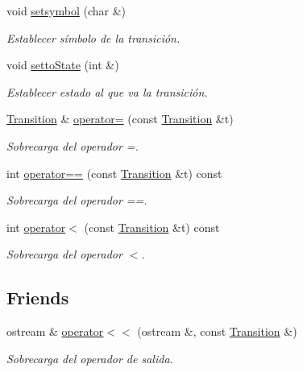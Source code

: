 \begin{DoxyCompactItemize}
void \hyperlink{class_transition_a5a20b15b7f4ab032742ad6391190cc6e}{setsymbol} (char \&)
\begin{DoxyCompactList}\small\item\em Establecer símbolo de la transición. \end{DoxyCompactList}\item 
void \hyperlink{class_transition_ab6247c399e434db72235b6764ff80d4e}{setto\+State} (int \&)
\begin{DoxyCompactList}\small\item\em Establecer estado al que va la transición. \end{DoxyCompactList}\item 
\hyperlink{class_transition}{Transition} \& \hyperlink{class_transition_a3bb2d846d692d08eae4f1f8a43fe212d}{operator=} (const \hyperlink{class_transition}{Transition} \&t)
\begin{DoxyCompactList}\small\item\em Sobrecarga del operador =. \end{DoxyCompactList}\item 
int \hyperlink{class_transition_accb01c1a940c05f24c306c506d8988ff}{operator==} (const \hyperlink{class_transition}{Transition} \&t) const
\begin{DoxyCompactList}\small\item\em Sobrecarga del operador ==. \end{DoxyCompactList}\item 
int \hyperlink{class_transition_a6dae95e1f97bf6f39a8ae10d210e0257}{operator$<$} (const \hyperlink{class_transition}{Transition} \&t) const
\begin{DoxyCompactList}\small\item\em Sobrecarga del operador $<$. \end{DoxyCompactList}\end{DoxyCompactItemize}
\subsection*{Friends}
\begin{DoxyCompactItemize}
\item 
ostream \& \hyperlink{class_transition_ab1393a65ad3451f1fb24f8fbf1f4247f}{operator$<$$<$} (ostream \&, const \hyperlink{class_transition}{Transition} \&)
\begin{DoxyCompactList}\small\item\em Sobrecarga del operador de salida. \end{DoxyCompactList}\end{DoxyCompactItemize}


